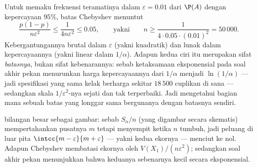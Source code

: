 \begin{example}\label{ex:b2:randomvar:llnnumeric}
Untuk memaku frekuensi teramatinya dalam $\varepsilon = 0.01$ dari
$\P(A)$ dengan kepercayaan $95\%$, batas Chebyshev menuntut
\[
\frac{p(1-p)}{n\varepsilon^2} \leq \frac{1}{4n\varepsilon^2}
\leq 0.05,
\qquad\text{yakni}\qquad
n \geq \frac{1}{4\cdot0.05\cdot(0.01)^2} = 50\,000 .
\]
Kebergantungannya brutal dalam $\varepsilon$ (yakni kuadratik) dan
lunak dalam kepercayaannya (yakni linear dalam $1/\alpha$). Adapun kedua ciri
itu merupakan sifat \emph{batasnya}, bukan sifat kebenarannya: sebab
ketaksamaan eksponensial pada soal akhir pekan menurunkan harga
kepercayaannya dari $1/\alpha$ menjadi $\ln(1/\alpha)$ --- jadi spesifikasi
yang sama kelak berharga sekitar $18\,500$ cuplikan di sana ---
sedangkan skala $1/\varepsilon^2$-nya sejati dan
tak terperbaiki. Jadi mengetahui bagian mana sebuah batas yang longgar sama
bergunanya dengan batasnya sendiri.
\end{example}

\begin{omfigure}

{\small {} bilangan besar sebagai gambar: sebab 
$S_n/n$ (yang digambar secara skematis) mempertahankan pusatnya $m$ tetapi
menyempit ketika $n$ tumbuh, jadi peluang di luar pita
$\intcc{m-\varepsilon}{m+\varepsilon}$ --- yakni kedua ekornya ---
menciut ke nol. Adapun Chebyshev membatasi ekornya oleh
$V(X_1)/(n\varepsilon^2)$; sedangkan soal akhir pekan menunjukkan bahwa keduanya
sebenarnya kecil secara eksponensial.}
\end{omfigure}

